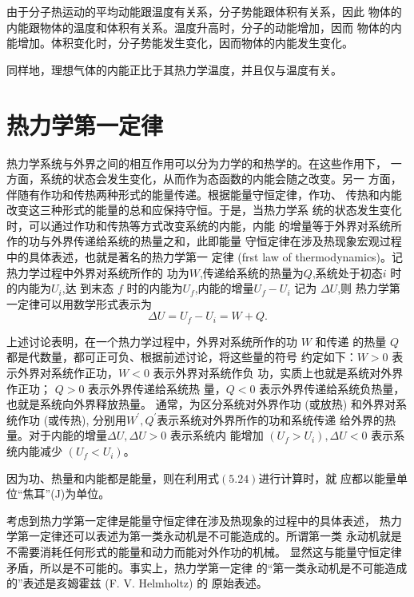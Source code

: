 由于分子热运动的平均动能跟温度有关系，分子势能跟体积有关系，因此
物体的内能跟物体的温度和体积有关系。温度升高时，分子的动能增加，因而
物体的内能增加。体积变化时，分子势能发生变化，因而物体的内能发生变化。

同样地，理想气体的内能正比于其热力学温度，并且仅与温度有关。
\section{热力学第一定律}
\begin{theorem}
    热力学系统与外界之间的相互作用可以分为力学的和热学的。在这些作用下，
    一方面，系统的状态会发生变化，从而作为态函数的内能会随之改变。另一
    方面，伴随有作功和传热两种形式的能量传递。根据能量守恒定律，作功、
    传热和内能改变这三种形式的能量的总和应保持守恒。于是，当热力学系
    统的状态发生变化时，可以通过作功和传热等方式改变系统的内能，内能
    的增量等于外界对系统所作的功与外界传递给系统的热量之和，此即能量
    守恒定律在涉及热现象宏观过程中的具体表述，也就是著名的热力学第一
    定律 (frst law of thermodynamics)。记热力学过程中外界对系统所作的
    功为$W$,传递给系统的热量为$Q$,系统处于初态$i$ 时的内能为$U_i$,达
    到末态 $f$ 时的内能为$U_f$,内能的增量$U_f-U_i$ 记为 $\Delta U$,则
    热力学第一定律可以用数学形式表示为
    \begin{equation}
        \Delta U=U_{f}-U_{i}=W+Q.
    \end{equation}
\end{theorem}
上述讨论表明，在一个热力学过程中，外界对系统所作的功 $W$ 和传递
的热量 $Q$ 都是代数量，都可正可负、根据前述讨论，将这些量的符号
约定如下：$W>0$ 表示外界对系统作正功，$W<0$ 表示外界对系统作负
功，实质上也就是系统对外界作正功； $Q>0$ 表示外界传递给系统热
量，$Q<0$ 表示外界传递给系统负热量，也就是系统向外界释放热量。
通常，为区分系统对外界作功 (或放热) 和外界对系统作功 (或传热), 
分别用$W^{\prime},Q^{\prime}$表示系统对外界所作的功和系统传递
给外界的热量。对于内能的增量$\Delta U,\Delta U>0$ 表示系统内
能增加 $(U_f>U_i),\Delta U<0$ 表示系统内能减少 $(U_f<U_i)$。

因为功、热量和内能都是能量，则在利用式$(5.24)$进行计算时，就
应都以能量单位“焦耳”(J)为单位。

考虑到热力学第一定律是能量守恒定律在涉及热现象的过程中的具体表述，
热力学第一定律还可以表述为第一类永动机是不可能造成的。所谓第一类
永动机就是不需要消耗任何形式的能量和动力而能对外作功的机械。
显然这与能量守恒定律矛盾，所以是不可能的。事实上，热力学第一定律
的“第一类永动机是不可能造成的”表述是亥姆霍兹 (F. V. Helmholtz) 的
原始表述。